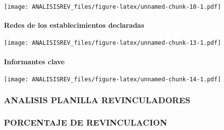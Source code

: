 \documentclass[
]{article}
\begin{document}
\texttt{[image: ANALISISREV\_files/figure-latex/unnamed-chunk-10-1.pdf]}

\hypertarget{redes-de-los-establecimientos-declaradas}{%
\paragraph{Redes de los establecimientos
declaradas}\label{redes-de-los-establecimientos-declaradas}}

\texttt{[image: ANALISISREV\_files/figure-latex/unnamed-chunk-13-1.pdf]}

\hypertarget{informantes-clave}{%
\paragraph{Informantes clave}\label{informantes-clave}}

\texttt{[image: ANALISISREV\_files/figure-latex/unnamed-chunk-14-1.pdf]}

\hypertarget{analisis-planilla-revinculadores}{%
\subsubsection{ANALISIS PLANILLA
REVINCULADORES}\label{analisis-planilla-revinculadores}}

\hypertarget{porcentaje-de-revinculacion}{%
\subsubsection{PORCENTAJE DE
REVINCULACION}\label{porcentaje-de-revinculacion}}
\end{document}
